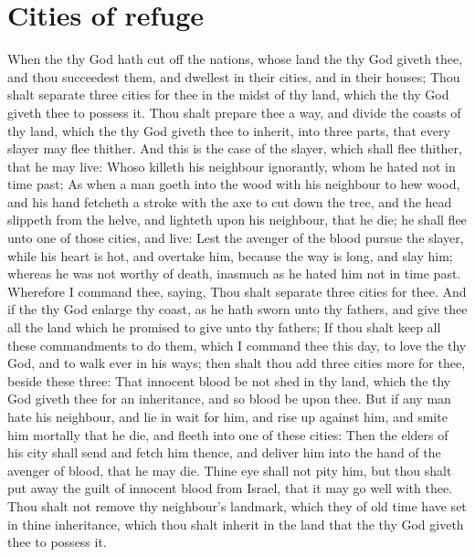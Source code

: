 \section*{Cities of refuge}
\begin{biblechapter} %
\verse When the \LORD thy God hath cut off the nations, whose land the \LORD thy God giveth thee, and thou succeedest them, and dwellest in their cities, and in their houses;
\verse Thou shalt separate three cities for thee in the midst of thy land, which the \LORD thy God giveth thee to possess it.
\verse Thou shalt prepare thee a way, and divide the coasts of thy land, which the \LORD thy God giveth thee to inherit, into three parts, that every slayer may flee thither.
\verse And this is the case of the slayer, which shall flee thither, that he may live: Whoso killeth his neighbour ignorantly, whom he hated not in time past;
\verse As when a man goeth into the wood with his neighbour to hew wood, and his hand fetcheth a stroke with the axe to cut down the tree, and the head slippeth from the helve, and lighteth upon his neighbour, that he die; he shall flee unto one of those cities, and live:
\verse Lest the avenger of the blood pursue the slayer, while his heart is hot, and overtake him, because the way is long, and slay him; whereas he was not worthy of death, inasmuch as he hated him not in time past.
\verse Wherefore I command thee, saying, Thou shalt separate three cities for thee.
\verse And if the \LORD thy God enlarge thy coast, as he hath sworn unto thy fathers, and give thee all the land which he promised to give unto thy fathers;
\verse If thou shalt keep all these commandments to do them, which I command thee this day, to love the \LORD thy God, and to walk ever in his ways; then shalt thou add three cities more for thee, beside these three:
\verse That innocent blood be not shed in thy land, which the \LORD thy God giveth thee for an inheritance, and so blood be upon thee.
\verse But if any man hate his neighbour, and lie in wait for him, and rise up against him, and smite him mortally that he die, and fleeth into one of these cities:
\verse Then the elders of his city shall send and fetch him thence, and deliver him into the hand of the avenger of blood, that he may die.
\verse Thine eye shall not pity him, but thou shalt put away the guilt of innocent blood from Israel, that it may go well with thee.
\verse Thou shalt not remove thy neighbour's landmark, which they of old time have set in thine inheritance, which thou shalt inherit in the land that the \LORD thy God giveth thee to possess it.

\end{biblechapter}
